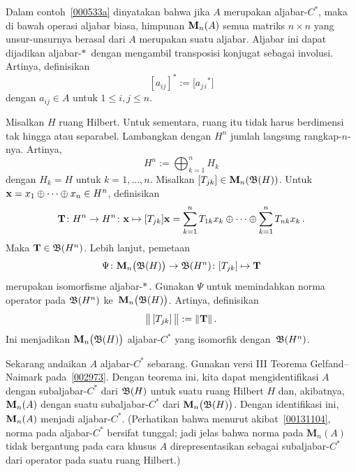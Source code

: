 \begin{exam} Dalam contoh~\ref{000533a} dinyatakan bahwa jika $A$ merupakan aljabar-$C^*$, maka di bawah
operasi aljabar biasa, himpunan $\mathbf{M}_{n}({A})$ semua matriks $n \times n$ yang unsur-unsurnya berasal dari
$A$ merupakan suatu aljabar. Aljabar ini dapat dijadikan aljabar-$*\,$ dengan mengambil transposisi
konjugat sebagai involusi. Artinya, definisikan
   \[ [ a_{ij}]^* := \bigl[ {a_{j\,i}}^*\bigr] \]
dengan $a_{ij} \in A$ untuk $1 \le i,j \le n$.

Misalkan $H$ ruang Hilbert. Untuk sementara, ruang itu tidak harus berdimensi tak hingga atau
separabel. Lambangkan dengan $H^n$ jumlah langsung rangkap-$n$-nya. Artinya,
   \[ H^n := \bigoplus_{k=1}^n H_k \]
dengan $H_k = H$ untuk $k = 1, \dots, n$. Misalkan $[T_{jk}] \in \mathbf M_n(\mathfrak{B}(H))$. Untuk
$\mathbf{x} = x_1 \oplus \dots \oplus x_n \in H^n$, definisikan
   \[ \mathbf{T} \colon H^n \rightarrow H^n \colon \mathbf{x} \mapsto [T_{jk}] \mathbf{x} =
            \sum_{k=1}^n T_{1k}x_k \oplus \dots \oplus \sum_{k=1}^n T_{nk}x_k \,. \]
Maka $\mathbf{T} \in \mathfrak{B}(H^n)$. Lebih lanjut, pemetaan
   \[ \Psi \colon \mathbf M_n\bigl(\mathfrak{B}(H)\bigr) \rightarrow \mathfrak{B}(H^n) \colon
             [T_{jk}] \mapsto \mathbf{T} \]
merupakan isomorfisme aljabar-$*\,$. Gunakan $\Psi$ untuk memindahkan norma operator pada $\mathfrak{B}(H^n)$ ke~$\mathbf M_n\bigl(\mathfrak{B}(H)\bigr)$. Artinya, definisikan
   \[ \bigl\lVert\,[T_{jk}]\,\bigr\rVert := \lVert\mathbf{T}\rVert\,. \]
Ini menjadikan $\mathbf M_n\bigl(\mathfrak{B}(H)\bigr)$ aljabar-$C^*$ yang isomorfik dengan~$\mathfrak{B}(H^n)$.

Sekarang andaikan $A$ aljabar-$C^*$ sebarang. Gunakan versi III Teorema
Gelfand--Naimark pada~\ref{002973}. Dengan teorema ini, kita dapat mengidentifikasi $A$ dengan
subaljabar-$C^*$ dari $\mathfrak{B}(H)$ untuk suatu ruang Hilbert $H$ dan, akibatnya,
$\mathbf{M}_{n}({A})$ dengan suatu subaljabar-$C^*$ dari $\mathbf M_n\bigl(\mathfrak{B}(H)\bigr)$. Dengan
identifikasi ini, $\mathbf{M}_{n}({A})$ menjadi aljabar-$C^*$. (Perhatikan bahwa menurut akibat~\ref{00131104},
norma pada aljabar-$C^*$ bersifat tunggal; jadi jelas bahwa norma pada $\mathbf M_n(A)$
tidak bergantung pada cara khusus $A$ direpresentasikan sebagai subaljabar-$C^*$ dari
operator pada suatu ruang Hilbert.)
\end{exam}

